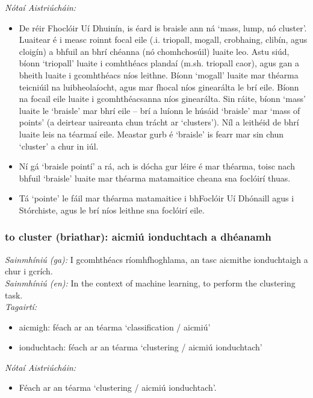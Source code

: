  \noindent \textit{Nótaí Aistriúcháin:}
\begin{itemize}
	\item De réir Fhoclóir Uí Dhuinín, is éard is braisle ann ná `mass, lump, nó cluster'. Luaitear é i measc roinnt focal eile (.i. triopall, mogall, crobhaing, clibín, agus cloigín) a bhfuil an bhrí chéanna (nó chomhchosúil) luaite leo. Astu siúd, bíonn `triopall' luaite i comhthéacs plandaí (m.sh. triopall caor), agus gan a bheith luaite i gcomhthéacs níos leithne. Bíonn `mogall' luaite mar théarma teicniúil na luibheolaíocht, agus mar fhocal níos ginearálta le brí eile. Bíonn na focail eile luaite i gcomhthéacsanna níos ginearálta. Sin ráite, bíonn `mass' luaite le `braisle' mar bhrí eile -- brí a luíonn le húsáid `braisle' mar `mass of points' (a deirtear uaireanta chun trácht ar `clusters'). Níl a leithéid de bhrí luaite leis na téarmaí eile. Meastar gurb é `braisle' is fearr mar sin chun `cluster' a chur in iúl.
	\item Ní gá `braisle pointí' a rá, ach is dócha gur léire é mar théarma, toisc nach bhfuil `braisle' luaite mar théarma matamaitice cheana sna foclóirí thuas.
	\item Tá `pointe' le fáil mar théarma matamaitice i bhFoclóir Uí Dhónaill agus i Stórchiste, agus le brí níos leithne sna foclóirí eile.
\end{itemize}


\subsubsection*{to cluster (briathar): aicmiú ionduchtach a dhéanamh}
 \noindent \textit{Sainmhíniú (ga):} I gcomhthéacs ríomhfhoghlama, an tasc aicmithe ionduchtaigh a chur i gcrích.
\\
 \noindent \textit{Sainmhíniú (en):} In the context of machine learning, to perform the clustering task.
\\
 \noindent \textit{Tagairtí:}
\begin{itemize}
	\item aicmigh: féach ar an téarma `classification / aicmiú'
	\item ionduchtach: féach ar an téarma `clustering / aicmiú ionduchtach'
\end{itemize}

 \noindent \textit{Nótaí Aistriúcháin:}
\begin{itemize}
	\item Féach ar an téarma `clustering / aicmiú ionduchtach'.
\end{itemize}


